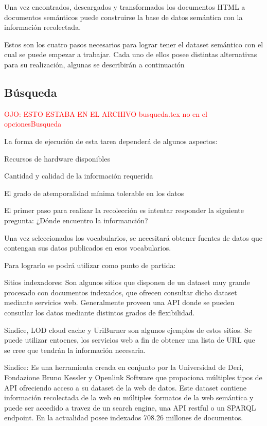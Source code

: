 Una vez encontrados, descargados y transformados los documentos HTML a documentos semánticos puede construirse la base de datos semántica 
con la información recolectada. 

Estos son los cuatro pasos necesarios para lograr tener el dataset semántico con el cual se puede empezar a trabajar. Cada uno de ellos 
posee distintas alternativas para su realización, algunas se describirán a continuación 



\subsection{Búsqueda}
%
\textcolor{red}{OJO: ESTO ESTABA EN EL ARCHIVO busqueda.tex no en el opcionesBusqueda}


La forma de ejecución de esta tarea dependerá de algunos aspectos:

Recursos de hardware disponibles

Cantidad y calidad de la información requerida

El grado de atemporalidad mínima tolerable en los datos

El primer paso para realizar la recolección es intentar responder la siguiente pregunta: ¿Dónde encuentro la informanción?

Una vez seleccionados los vocabularios, se necesitará obtener fuentes de datos que contengan sus datos publicados en esos vocabularios.
 
Para lograrlo se podrá utilizar como punto de partida:

Sitios indexadores: Son algunos sitios que disponen de un dataset muy grande procesado con documentos indexados, que ofrecen consultar dicho 
dataset mediante servicios web. Generalmente proveen una API donde se pueden consutlar los datos mediante distintos grados de flexibilidad.

Sindice, LOD cloud cache y UriBurner son algunos ejemplos de estos sitios. Se puede utilizar entocnes, los servicios web a fin
de obtener una lista de URL que se cree que tendrán la información necesaria.

Sindice: Es una herramienta creada en conjunto por la Universidad de Deri,  Fondazione Bruno Kessler y Openlink Software que propociona múltiples tipos de API ofreciendo acceso a su dataset de la web de datos. Este dataset contiene información recolectada de la web en múltiples formatos de la web semántica y puede ser accedido a travez de un search engine, una API restful o un SPARQL endpoint.  
En la actualidad posee indexados 708.26 millones de documentos.

